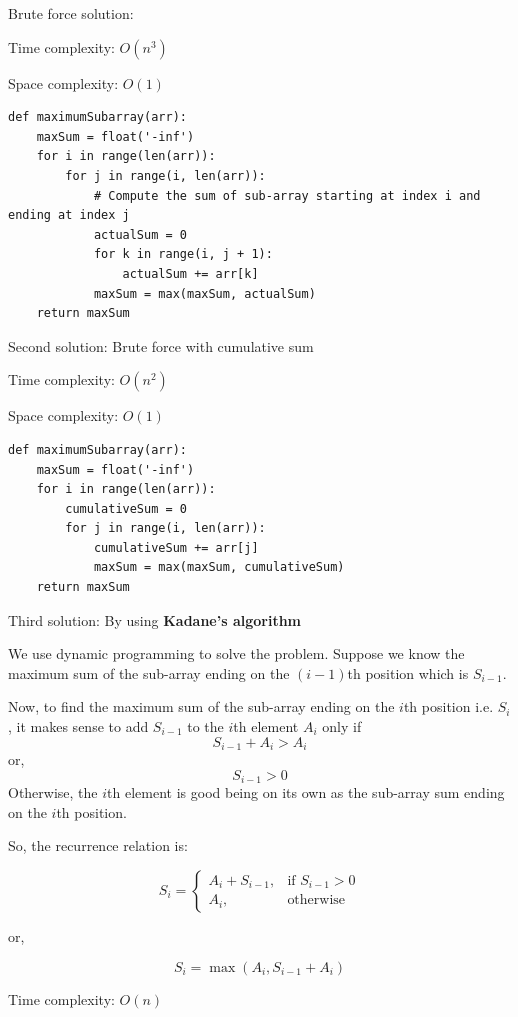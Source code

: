 \documentclass[a4paper,11pt]{book}
\begin{document}
\noindent Brute force solution:

\noindent Time complexity: $O(n^3)$

\noindent Space complexity: $O(1)$

\begin{lstlisting}
def maximumSubarray(arr):
    maxSum = float('-inf')
    for i in range(len(arr)):
        for j in range(i, len(arr)):
            # Compute the sum of sub-array starting at index i and ending at index j
            actualSum = 0
            for k in range(i, j + 1):
                actualSum += arr[k]
            maxSum = max(maxSum, actualSum)
    return maxSum
\end{lstlisting}

\noindent Second solution: Brute force with cumulative sum

\noindent Time complexity: $O(n^2)$

\noindent Space complexity: $O(1)$

\begin{lstlisting}
def maximumSubarray(arr):
    maxSum = float('-inf')
    for i in range(len(arr)):
        cumulativeSum = 0
        for j in range(i, len(arr)):
            cumulativeSum += arr[j]
            maxSum = max(maxSum, cumulativeSum)
    return maxSum
\end{lstlisting}

\noindent Third solution: By using \textbf{Kadane's algorithm}

\noindent We use dynamic programming to solve the problem. Suppose we know the maximum sum of the sub-array ending on the $(i-1)$th position which is $S_{i-1}$.

\noindent Now, to find the maximum sum of the sub-array ending on the $i$th position i.e. $S_i$, it makes sense to add $S_{i-1}$ to the $i$th element $A_i$ only if 
$$S_{i-1} + A_i > A_i$$
or,
$$S_{i-1} > 0$$
\noindent Otherwise, the $i$th element is good being on its own as the sub-array sum ending on the $i$th position.

\noindent So, the recurrence relation is:

\[
    S_i = 
\begin{cases}
    A_i + S_{i-1} ,& \text{if } S_{i-1} > 0\\
    A_i,              & \text{otherwise}
\end{cases}
\]

or,

$$S_i = \max(A_i, S_{i-1} + A_i)$$

\noindent Time complexity: $O(n)$
\end{document}
